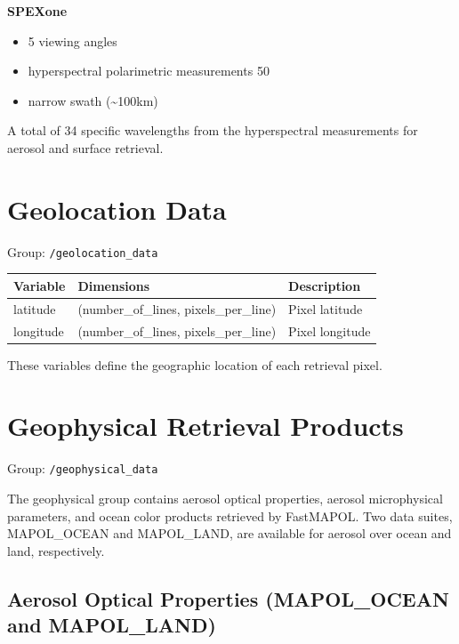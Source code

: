 \documentclass[
  11pt,
  letterpaper,
  DIV=11,
  numbers=noendperiod]{scrreprt}
\providecommand{\tightlist}{%
  \setlength{\itemsep}{0pt}\setlength{\parskip}{0pt}}
\begin{document}
\textbf{SPEXone}

\begin{itemize}
\tightlist
\item
  5 viewing angles\\
\item
  hyperspectral polarimetric measurements 50
\item
  narrow swath (\textasciitilde100km)
\end{itemize}

A total of 34 specific wavelengths from the hyperspectral measurements
for aerosol and surface retrieval.

\section{Geolocation Data}\label{geolocation-data}

Group: \texttt{/geolocation\_data}

\begin{longtable}[]{@{}lll@{}}
\toprule\noalign{}
Variable & Dimensions & Description \\
\midrule\noalign{}
\endhead
\bottomrule\noalign{}
\endlastfoot
latitude & (number\_of\_lines, pixels\_per\_line) & Pixel latitude \\
longitude & (number\_of\_lines, pixels\_per\_line) & Pixel longitude \\
\end{longtable}

These variables define the geographic location of each retrieval pixel.

\section{Geophysical Retrieval
Products}\label{geophysical-retrieval-products}

Group: \texttt{/geophysical\_data}

The geophysical group contains aerosol optical properties, aerosol
microphysical parameters, and ocean color products retrieved by
FastMAPOL. Two data suites, MAPOL\_OCEAN and MAPOL\_LAND, are available
for aerosol over ocean and land, respectively.

\subsection{Aerosol Optical Properties (MAPOL\_OCEAN and
MAPOL\_LAND)}\label{aerosol-optical-properties-mapol_ocean-and-mapol_land}
\end{document}

